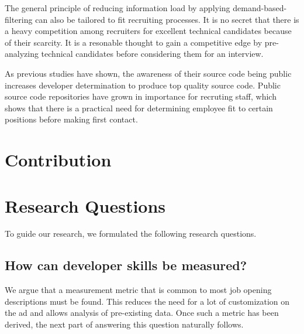 The general principle of reducing information load by applying
demand-based-filtering can also be tailored to fit recruiting processes. It is
no secret that there is a heavy competition among recruiters for excellent
technical candidates because of their scarcity. It is a resonable thought
to gain a competitive edge by pre-analyzing technical candidates
before considering them for an interview.
\newline

As previous studies have shown, the awareness of their source
code being public increases developer determination
to produce top quality source code\cite{md:2013}.
Public source code repositories have grown in importance for recruting
staff, which shows that there is a practical need for determining
employee fit to certain positions before making first contact.

\section{Contribution}

\section{Research Questions} \label{sec:research-questions}

To guide our research, we formulated the following research questions.

\subsection{How can developer skills be measured?}\label{subsec:dev-skill-measurement}
We argue that a measurement metric that is common to most job opening
descriptions must be found. This reduces the need for a lot of customization
on the ad and allows analysis of pre-existing data.
Once such a metric has been derived, the next part of answering this question
naturally follows.
\newline

